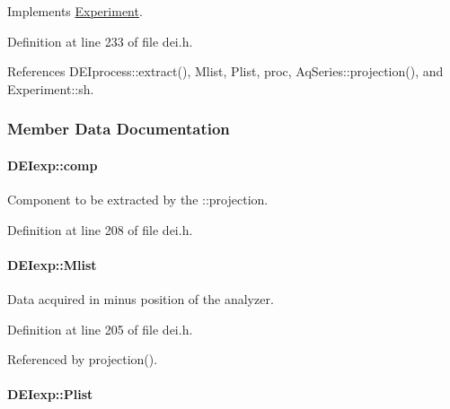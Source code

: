 Implements \hyperlink{classExperiment_a154d68b031d0e181295ee2adbd66d8c3}{Experiment}.



Definition at line 233 of file dei.h.



References DEIprocess::extract(), Mlist, Plist, proc, AqSeries::projection(), and Experiment::sh.



\subsubsection{Member Data Documentation}
\hypertarget{classDEIexp_ad8992574364a39e5e016a439323251a1}{
\paragraph[{comp}]{ {\bf DEIexp::comp}}\hfill}
\label{classDEIexp_ad8992574364a39e5e016a439323251a1}


Component to be extracted by the ::projection. 



Definition at line 208 of file dei.h.

\hypertarget{classDEIexp_a7bbcf7cedf31bde767e23d713b2f2b91}{
\paragraph[{Mlist}]{ {\bf DEIexp::Mlist}}\hfill}
\label{classDEIexp_a7bbcf7cedf31bde767e23d713b2f2b91}


Data acquired in minus position of the analyzer. 



Definition at line 205 of file dei.h.



Referenced by projection().

\hypertarget{classDEIexp_a8a68a17d467ff60766bb46dc86b86950}{
\paragraph[{Plist}]{ {\bf DEIexp::Plist}}\hfill}
\label{classDEIexp_a8a68a17d467ff60766bb46dc86b86950}



